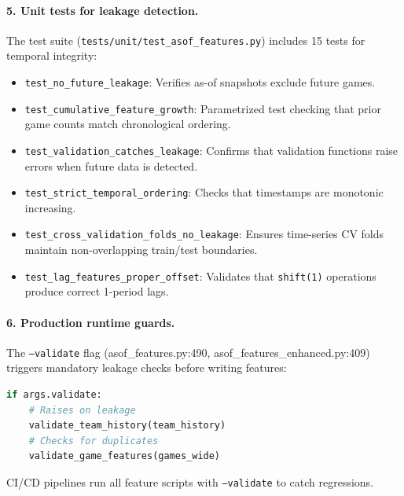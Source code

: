 \paragraph{5. Unit tests for leakage detection.}
The test suite (\texttt{tests/unit/\allowbreak test\_asof\_features.py}) includes 15 tests for temporal integrity:
\begin{itemize}
  \item \texttt{test\_no\_future\_leakage}: Verifies as-of snapshots exclude future games.
  \item \texttt{test\_cumulative\_feature\_growth}: Parametrized test checking that prior game counts match chronological ordering.
  \item \texttt{test\_validation\_catches\_leakage}: Confirms that validation functions raise errors when future data is detected.
  \item \texttt{test\_strict\_temporal\_ordering}: Checks that timestamps are monotonic increasing.
  \item \texttt{test\_cross\_validation\_folds\_no\_leakage}: Ensures time-series CV folds maintain non-overlapping train/test boundaries.
  \item \texttt{test\_lag\_features\_proper\_offset}: Validates that \texttt{shift(1)} operations produce correct 1-period lags.
\end{itemize}

\paragraph{6. Production runtime guards.}
The \texttt{--validate} flag (asof\_features.py:490, asof\_features\_enhanced.py:409) triggers mandatory leakage checks before writing features:
\begin{lstlisting}[language=Python,basicstyle=\ttfamily\scriptsize,breaklines=true,postbreak=\mbox{\textcolor{red}{$\hookrightarrow$}\space}]
if args.validate:
    # Raises on leakage
    validate_team_history(team_history)
    # Checks for duplicates
    validate_game_features(games_wide)
\end{lstlisting}
CI/CD pipelines run all feature scripts with \texttt{--validate} to catch regressions.

